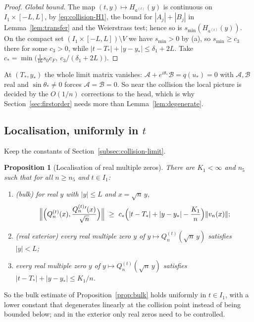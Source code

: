 \documentclass[11pt]{amsart}
\newtheorem{proposition}[theorem]{Proposition}
\theoremstyle{definition}
\theoremstyle{remark}
\numberwithin{equation}{section}
\begin{document}
\begin{proof}
\emph{Global bound.} The map $(t,y)\mapsto H_{a^{(t)}}(y)$ is continuous on $I_1\times[-L,L]$, by \eqref{eq:collision-H1}, the bound for $|A_j|+|B_j|$ in Lemma~\ref{lem:transfer} and the Weierstrass test; hence so is $s_{\min}(H_{a^{(t)}}(y))$. On the compact set $(I_1\times[-L,L])\setminus V$ we have $s_{\min}>0$ by (a), so $s_{\min}\ge c_3$ there for some $c_3>0$, while $|t-T_*|+|y-y_*|\le\delta_1+2L$. Take $c_*=\min\bigl(\frac1{16}s_0c_F,\ c_3/(\delta_1+2L)\bigr)$.
\end{proof}

At $(T_*,y_*)$ the whole limit matrix vanishes: $\mathcal A+e^{i\theta_*}\mathcal B=q(u_*)=0$ with $\mathcal A,\mathcal B$ real and $\sin\theta_*\ne0$ forces $\mathcal A=\mathcal B=0$. So near the collision the local picture is decided by the $O(1/n)$ corrections to the head, which is why Section~\ref{sec:firstorder} needs more than Lemma~\ref{lem:degenerate}.

\subsection{Localisation, uniformly in \texorpdfstring{$t$}{t}}\label{subsec:collision-localise}
Keep the constants of Section~\ref{subsec:collision-limit}.

\begin{proposition}[Localisation of real multiple zeros]\label{prop:localise}
There are $K_1<\infty$ and $n_5$ such that for all $n\ge n_5$ and $t\in I_1$:
\begin{enumerate}
\item[(a)] \emph{(bulk)} for real $y$ with $|y|\le L$ and $x=\sqrt n\,y$,
\[
\Bigl\|\Bigl(Q_n^{(t)}(x),\frac{Q_n^{(t)}{}'(x)}{\sqrt n}\Bigr)\Bigr\|\ \ge\ c_*\Bigl(|t-T_*|+|y-y_*|-\frac{K_1}n\Bigr)\|v_n(x)\| ;
\]
\item[(b)] \emph{(real exterior)} every real multiple zero $y$ of $y\mapsto Q_n^{(t)}(\sqrt n\,y)$ satisfies $|y|<L$;
\item[(c)] every real multiple zero $y$ of $y\mapsto Q_n^{(t)}(\sqrt n\,y)$ satisfies $|t-T_*|+|y-y_*|\le K_1/n$.
\end{enumerate}
\end{proposition}

So the bulk estimate of Proposition~\ref{prop:bulk} holds uniformly in $t\in I_1$, with a lower constant that degenerates linearly at the collision point instead of being bounded below; and in the exterior only real zeros need to be controlled.
\end{document}
